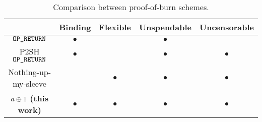 \begin{table}[h!]
    \newcommand{\y}{$\bullet$}
    \newcommand{\n}{}
    \centering
    \caption{Comparison between proof-of-burn schemes.\label{table:comparison}}

    \begin{tabular}{ |c|c|c|c|c| }
     \hline
                                        & Binding & Flexible & Unspendable & Uncensorable \\
     \hline
     $\texttt{OP\_RETURN}$                        & \y      & \n       & \y          & \n \\
     P2SH $\texttt{OP\_RETURN}$                   & \y      & \n       & \y          & \y \\
     Nothing-up-my-sleeve               & \n      & \y       & \y          & \y \\
     $a \oplus 1$ \textbf{(this work)}    & \y      & \y       & \y          & \y \\
     \hline
    \end{tabular}
\end{table}
